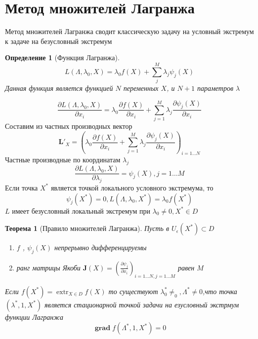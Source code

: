 \documentclass[14pt]{extarticle}
\newtheorem{theorem}{Теорема}
\newtheorem{definiiton}{Определение}
\DeclareMathOperator{\extr}{extr}
\DeclareMathOperator{\grad}{\textbf{grad}}
\newcommand{\pa}[2]{ \frac{\partial #1}{\partial #2}}
\begin{document}
\section{Метод множителей Лагранжа}
Метод множителей Лагранжа сводит классическую задачу
на условный экстремум к задаче на безусловный экстремум
\begin{definiiton}[Функция Лагранжа]
	\begin{equation}
	L(\Lambda,\lambda_0,X) = 
	\lambda_0 f(X) + \sum_{j}^{M} \lambda_{j} \psi_{j}(X)
	\end{equation} 
	Данная функция является функцией $N$ переменных  $X$,
	и   $N + 1$ параметров  $\lambda$
\end{definiiton}
\begin{equation}
	\pa{L(\Lambda,\lambda_0,X)}{x_{i}} = \lambda_0 \pa{f(X)}{x_{i}} + \sum_{j =1}^{M} \lambda_{j} \pa{\psi_{j}(X)}{x_{i}}
\end{equation} 
Составим из частных производных вектор
\begin{equation}
\mathbf{L}'_{X} = (\lambda_0 \pa{f(X)}{x_{i}} + \sum_{j =1}^{M} \lambda_{j} \pa{\psi_{j}(X)}{x_{i}}
)_{i = 1 \dots N}
\end{equation} 
Частные производные по координатам $\lambda_{j}$
 \begin{equation}
	 \pa{L(\Lambda,\lambda_0,X)}{\lambda_{j}} = \psi_{j}(X), j = 1 \dots M
 \end{equation}
 Если точка $X^{*}$ является точкой локального условного 
 экстремума, то
 \begin{equation}
 \psi_{j}(X^{*}) = 0, L(\Lambda,\lambda_0,X^{*}) = \lambda_0 f(X^{*})
 \end{equation} 
 $L$ имеет безусловный локальный экстремум при  $\lambda_0 \neq 0, X^{*} \in D$
  \begin{theorem}[Правило множителей Лагранжа]
	  Пусть в $U_{\epsilon}(X^{*}) \subset D$
	   \begin{enumerate}
	   	\item $f$ , $\psi_{j}(X)$  непрерывно дифференцируемы
		\item ранг матрицы Якоби $\mathbf{J}(X) =  (\pa{\psi_{j}}{x_{i}})_{i = 1\dots N, j = 1 \dots M}$ равен $M$
	   \end{enumerate}
	   Если $f(X^{*}) = \extr_{X \in D} f(X)$ 
	   то существуют $\lambda^{*}_0 \neq_0, \Lambda^{*} \neq 0$,что точка $(\lambda^{*},1,X^{*})$ является стационарной точкой
	   задачи на езусловный экстрмум функции Лагранжа
	   \begin{equation}
	   \grad f(\Lambda^{*},1,X^{*}) = 0
	   \end{equation} 
  \end{theorem}
\end{document}
